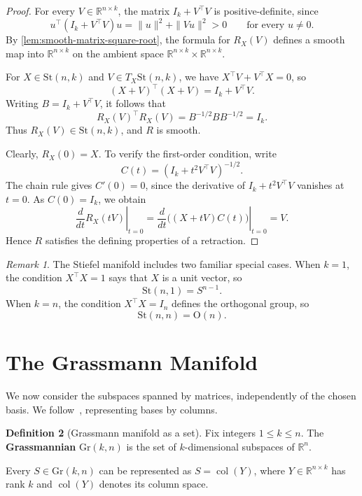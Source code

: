 \documentclass[12pt]{article}
\theoremstyle{definition}
\newtheorem{definition}{Definition}[section]
\theoremstyle{plain}
\theoremstyle{remark}
\newtheorem{remark}[definition]{Remark}
\newcommand{\R}{\mathbb{R}}
\newcommand{\St}{\mathrm{St} (n,k)}
\newcommand{\Gr}{\mathrm{Gr} (k,n)}
\newcommand{\Orth}{\mathrm{O}}               %
\DeclareMathOperator{\col}{col}              %
\begin{document}
\begin{proof}
  For every \( V \in \R^{n \times k} \), the matrix \( I_k+V^\top V \) is positive-definite, since
  \[
    u^\top(I_k+V^\top V)u = \|u\|^2 + \|Vu\|^2 > 0 \qquad \text{for every } u \ne 0.
  \]
  By \cref{lem:smooth-matrix-square-root}, the formula for \( R_X(V) \) defines a smooth map into \( \R^{n \times k} \) on the ambient space \( \R^{n \times k} \times \R^{n \times k} \).

  For \( X \in \St \) and \( V \in T_X\St \), we have \( X^\top V + V^\top X = 0 \), so
  \[
    (X+V)^\top(X+V) = I_k+V^\top V.
  \]
  Writing \( B = I_k+V^\top V \), it follows that
  \[
    R_X(V)^\top R_X(V) = B^{-1/2} B B^{-1/2} = I_k.
  \]
  Thus \( R_X(V) \in \St \), and \( R \) is smooth.

  Clearly, \( R_X(0) = X \). To verify the first-order condition, write
  \[
    C(t) = (I_k+t^2V^\top V)^{-1/2}.
  \]
  The chain rule gives \( C'(0) = 0 \), since the derivative of \( I_k+t^2V^\top V \) vanishes at \( t=0 \).
  As \( C(0) = I_k \), we obtain
  \[
    \left.\frac{d}{dt}R_X(tV)\right|_{t=0} = \left.\frac{d}{dt}\bigl((X+tV)C(t)\bigr)\right|_{t=0} = V.
  \]
  Hence \( R \) satisfies the defining properties of a retraction.
\end{proof}

\begin{remark}
  The Stiefel manifold includes two familiar special cases.
  When \( k=1 \), the condition \( X^\top X=1 \) says that \( X \) is a unit vector, so
  \[
    \mathrm{St}(n,1)=S^{n-1}.
  \]
  When \( k=n \), the condition \( X^\top X=I_n \) defines the orthogonal group, so
  \[
    \mathrm{St}(n,n)=\Orth(n).
  \]
\end{remark}

\section{The Grassmann Manifold}\label{sec:grassmann}


We now consider the subspaces spanned by matrices, independently of the chosen basis.
We follow~\cite[Example 2.31]{segal}, representing bases by columns.

\begin{definition}[Grassmann manifold as a set]\label{def:grassmann}
  Fix integers \( 1 \le k \le n \). The \textbf{Grassmannian} \( \Gr \) is the set of \( k \)-dimensional subspaces of \( \R^n \).

  Every \( S \in \Gr \) can be represented as \( S = \col(Y) \), where \( Y \in \R^{n \times k} \) has rank \( k \) and \( \col(Y) \) denotes its column space.
\end{definition}
\end{document}

